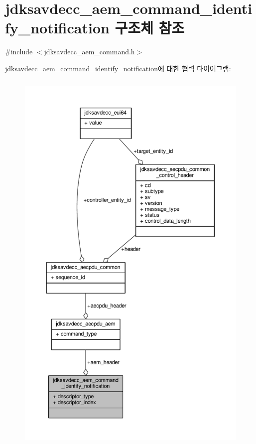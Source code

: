 \hypertarget{structjdksavdecc__aem__command__identify__notification}{}\section{jdksavdecc\+\_\+aem\+\_\+command\+\_\+identify\+\_\+notification 구조체 참조}
\label{structjdksavdecc__aem__command__identify__notification}


{\ttfamily \#include $<$jdksavdecc\+\_\+aem\+\_\+command.\+h$>$}



jdksavdecc\+\_\+aem\+\_\+command\+\_\+identify\+\_\+notification에 대한 협력 다이어그램\+:
\nopagebreak
\begin{figure}[H]
\begin{center}
\leavevmode
\includegraphics[height=550pt]{structjdksavdecc__aem__command__identify__notification__coll__graph}
\end{center}
\end{figure}
